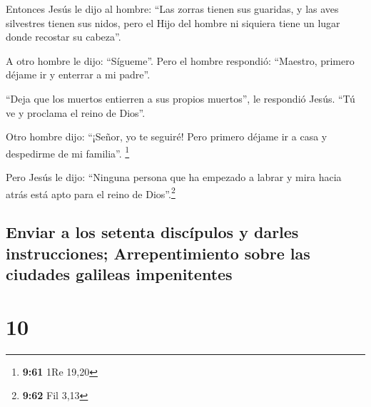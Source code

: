  Entonces Jesús le dijo al hombre: ``Las zorras tienen
sus guaridas, y las aves silvestres tienen sus nidos, pero el Hijo del
hombre ni siquiera tiene un lugar donde recostar su cabeza''.

 A otro hombre le dijo: ``Sígueme''. Pero el hombre
respondió: ``Maestro, primero déjame ir y enterrar a mi padre''.

 ``Deja que los muertos entierren a sus propios
muertos'', le respondió Jesús. ``Tú ve y proclama el reino de Dios''.

 Otro hombre dijo: ``¡Señor, yo te seguiré! Pero primero
déjame ir a casa y despedirme de mi familia''. \footnote{\textbf{9:61}
  1Re 19,20}

 Pero Jesús le dijo: ``Ninguna persona que ha empezado a
labrar y mira hacia atrás está apto para el reino de Dios''.\footnote{\textbf{9:62}
  Fil 3,13}

\hypertarget{enviar-a-los-setenta-discuxedpulos-y-darles-instrucciones-arrepentimiento-sobre-las-ciudades-galileas-impenitentes}{%
\subsection{Enviar a los setenta discípulos y darles instrucciones;
Arrepentimiento sobre las ciudades galileas
impenitentes}\label{enviar-a-los-setenta-discuxedpulos-y-darles-instrucciones-arrepentimiento-sobre-las-ciudades-galileas-impenitentes}}

\hypertarget{section-9}{%
\section{10}\label{section-9}}

